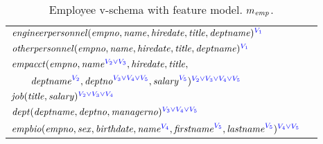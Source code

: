 \begin{table}
\caption[short caption]{Employee v-schema with feature model.
 \ensuremath{\fModel_\employee}.}
\vspace{-8pt}
\label{tab:emp-vsch}
\begin{center}
\small
\begin{tabular} {|l|l|}
\hline
\rule{0pt}{3ex}%
$\engemp(\empno, \name, \hiredate,\titleatt,\deptname)^{\textcolor{blue}
\vOne}$ \\[1.1ex]
$\othemp(\empno, \name, \hiredate, \titleatt, \deptname)^{\textcolor{blue}
\vOne}$ \\[1.1ex]
$\empacct(\empno, \annot [\textcolor{blue}{\vTwo \vee \vThree}] \name,
\hiredate, \titleatt,$ \\
$\qquad\annot[\textcolor{blue} \vTwo]\deptname, \annot
[\textcolor{blue} {\vThree \vee \vFour \vee \vFive}]\deptno,\annot
[\textcolor{blue} \vFive]\salary)^{\textcolor{blue}{\vTwo \vee \vThree \vee
\vFour \vee \vFive}}$ \\[1.1ex]
$\job(\titleatt, \salary)^{\textcolor{blue}{\vTwo \vee \vThree \vee \vFour}}$
\\[1.1ex]
$\dept(\deptname, \deptno, \managerno)^{\textcolor{blue}{\vThree \vee \vFour
\vee \vFive}}$ \\[1.1ex]
$\empbio(\empno, \sex, \birthdate, \annot [\textcolor{blue} \vFour] \name,
\annot[\textcolor{blue}\vFive]{\fname}, \annot[\textcolor{blue}
\vFive]{\lname})^{\textcolor{blue} {\vFour \vee \vFive}}$ \\
\hline
\end{tabular}
\vspace{-12pt}
\end{center}
\end{table}
